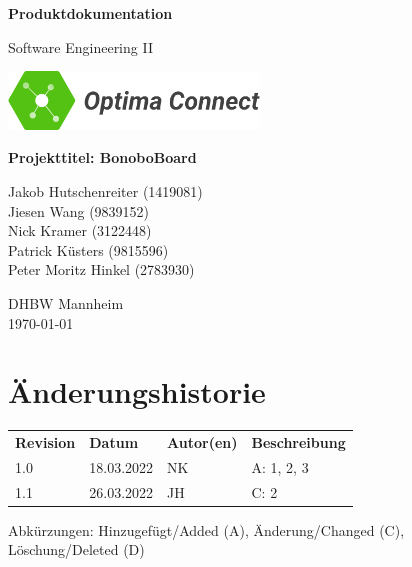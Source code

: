 \documentclass[a4paper,11pt]{scrartcl}
\begin{document}
\renewcommand*{\arraystretch}{1.2}
\begin{titlepage}
    \begin{center}
        \vspace*{1cm}\Huge
        \textbf{Produktdokumentation}\par                
        \vspace{0.5cm}\LARGE        
        Software Engineering II\par           
        \vspace{2cm}
        \includegraphics[width=0.5\textwidth]{OptimaLogo_long}\par   
        \vspace{1cm}
        \textbf{Projekttitel: BonoboBoard}\par        
        \vfill\Large   
        Jakob Hutschenreiter (1419081)\\Jiesen Wang (9839152)\\Nick Kramer (3122448)\\Patrick Küsters (9815596)\\Peter Moritz Hinkel (2783930)\par
        \vspace{2cm}
        DHBW Mannheim\\
        \today     
    \end{center}
\end{titlepage}

\section*{Änderungshistorie}
\begin{table}[h]
	\begin{tabular}{@{} p{20mm} p{25mm} p{25mm} p{75mm}}
		\textbf{Revision} & \textbf{Datum} & \textbf{Autor(en)} & \textbf{Beschreibung}\\
		1.0 & 18.03.2022 & NK & A: 1, 2, 3\\
        1.1 & 26.03.2022 & JH & C: 2\\
	\end{tabular}
\end{table}
\noindent
Abkürzungen: Hinzugefügt/Added (A), Änderung/Changed (C), Löschung/Deleted (D)
\vspace{2cm}
\tableofcontents
\newpage
{}
\end{document}
